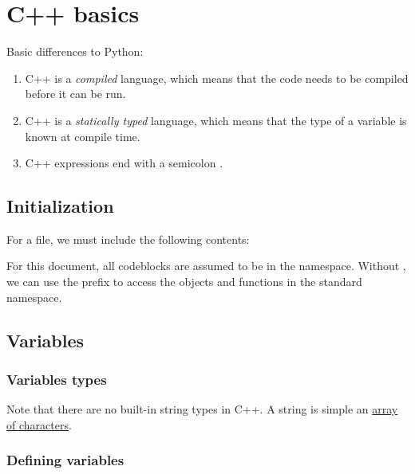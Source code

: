 \documentclass{article}
\begin{document}



\section{C++ basics}
Basic differences to Python:
\begin{enumerate}
    \item C++ is a \emph{compiled} language, which means that the code needs to be compiled before it can be run.
    \item C++ is a \emph{statically typed} language, which means that the type of a variable is known at compile time.
    \item C++ expressions end with a semicolon .
\end{enumerate}
\subsection{Initialization}
For a  file, we must include the following contents:

For this document, all codeblocks are assumed to be in the  namespace. Without , we can use the  prefix to access the objects and functions in the standard namespace.

\subsection{Variables}
\subsubsection{Variables types}

Note that there are no built-in string types in C++. A string is simple an \hyperref[sec:array]{array of characters}.

\subsubsection{Defining variables}

\end{document}
